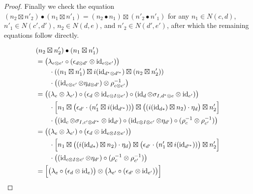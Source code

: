 \documentclass[12pt,oneside,article,draft]{memoir}
\begin{document}
\begin{proof}
	Finally we check the equation $(n_2\boxtimes n'_2)\bullet(n_1\boxtimes n'_1)=(n_2\bullet n_1)\boxtimes(n'_2\bullet n'_1)$ for any $n_1\in N(c,d)$, $n'_1\in N(c',d')$, $n_2\in N(d,e)$, and $n'_2\in N(d',e')$, after which the remaining equations follow directly.

	\begin{align*}
		&(n_2\boxtimes n'_2)\bullet(n_1\boxtimes n'_1) \\
		&= \bigl(\lambda_{e\otimes e'}\circ(\epsilon_{d\otimes d'}\otimes\id_{e\otimes e'})\bigr) \\
		&\qquad \cdot\left((n_1\boxtimes n'_1)\boxtimes i(\id_{d^*\otimes d'^{*}})\boxtimes(n_2\boxtimes n'_2)\right) \\
		&\qquad \cdot\left((\id_{c\otimes c'}\otimes\eta_{d\otimes d'})\otimes\rho_{c\otimes c'}^{-1}\right)\\
		&= \bigl((\lambda_e\otimes\lambda_{e'})\circ(\epsilon_d\otimes\id_{e\otimes I\otimes e'})\circ(\id_d\otimes\sigma_{I,d^*\otimes e}\otimes\id_{e'})\bigr) \\
		&\qquad \cdot\Bigl[n_1\boxtimes\bigl(\epsilon_{d'}\cdot(n'_1\boxtimes i(\id_{d'^{*}}))\bigr)\boxtimes\bigl((i(\id_{d*})\boxtimes n_2)\cdot\eta_d\bigr)\boxtimes n'_2\Bigr] \\
		&\qquad \cdot\bigl((\id_c\otimes\sigma_{I,c'\otimes d'^*}\otimes\id_{d'})\circ(\id_{c\otimes I\otimes c'}\otimes\eta_{d'})\circ(\rho_c^{-1}\otimes\rho_{c'}^{-1})\bigr) \\
		&= \bigl((\lambda_e\otimes\lambda_{e'})\circ(\epsilon_d\otimes\id_{e\otimes I\otimes e'})\bigr) \\
		&\qquad \cdot\Bigl[n_1\boxtimes\bigl((i(\id_{d*})\boxtimes n_2)\cdot\eta_d\bigr)\boxtimes\bigl(\epsilon_{d'}\cdot(n'_1\boxtimes i(\id_{d'^{*}}))\bigr)\boxtimes n'_2\Bigr] \\
		&\qquad \cdot\bigl((\id_{c\otimes I\otimes c'}\otimes\eta_{d'})\circ(\rho_c^{-1}\otimes\rho_{c'}^{-1})\bigr) \\
		&= \Bigl[\bigl(\lambda_e\circ(\epsilon_d\otimes\id_e)\bigr)\otimes\bigl(\lambda_{e'}\circ(\epsilon_{d'}\otimes\id_{e'})\bigr)\Bigr] \\

\end{align*}
\end{proof}
\end{document}
